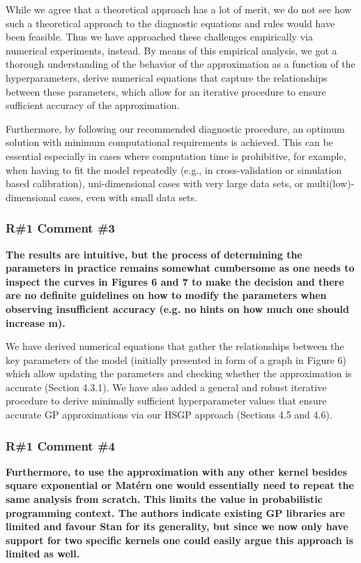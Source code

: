 \documentclass[11pt]{report}
\begin{document}
While we agree that a theoretical approach has a lot of merit, we do not see how such a theoretical approach to the diagnostic equations and rules would have been feasible. Thus we have approached these challenges empirically via numerical experiments, instead. By means of this empirical analysis, we got a thorough understanding of the behavior of the approximation as a function of the hyperparameters, derive numerical equations that capture the relationships between these parameters, which allow for an iterative procedure to ensure sufficient accuracy of the approximation.

Furthermore, by following our recommended diagnostic procedure, an optimum solution with minimum computational requirements is achieved. This can be essential especially in cases where computation time is prohibitive, for example, when having to fit the model repeatedly (e.g., in cross-validation or simulation based calibration), uni-dimensional cases with very large data sets, or multi(low)-dimensional cases, even with small data sets. 

\subsubsection*{R\#1 Comment \#3}

\textbf{The results are intuitive, but the process of determining the parameters in practice remains somewhat cumbersome as one needs to inspect the curves in Figures 6 and 7 to make the decision and there are no definite guidelines on how to modify the parameters when observing insufficient accuracy (e.g. no hints on how much one should increase m).}

We have derived numerical equations that gather the relationships between the key parameters of the model (initially presented in form of a graph in Figure 6) which allow updating the parameters and checking whether the approximation is accurate (Section 4.3.1). We have also added a general and robust iterative procedure to derive minimally sufficient hyperparameter values that ensure accurate GP approximations via our HSGP approach (Sections 4.5 and 4.6).

\subsubsection*{R\#1 Comment \#4}

\textbf{Furthermore, to use the approximation with any other kernel besides square exponential or Matérn one would essentially need to repeat the same analysis from scratch. This limits the value in probabilistic programming context. The authors indicate existing GP  libraries are limited and favour Stan for its generality, but since we now only have support for two specific kernels one could easily argue this approach is limited as well.}
\end{document}
